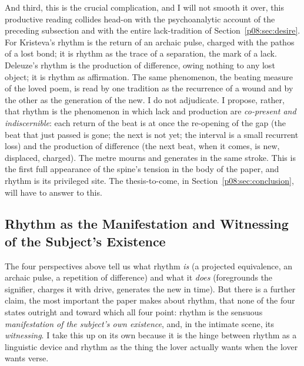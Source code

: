 And third, this is the crucial complication, and I will not smooth it over, this productive reading collides head-on with the psychoanalytic account of the preceding subsection and with the entire lack-tradition of Section~\ref{p08:sec:desire}. For Kristeva's rhythm is the return of an archaic pulse, charged with the pathos of a lost bond; it is rhythm as the trace of a separation, the mark of a lack. Deleuze's rhythm is the production of difference, owing nothing to any lost object; it is rhythm as affirmation. The same phenomenon, the beating measure of the loved poem, is read by one tradition as the recurrence of a wound and by the other as the generation of the new. I do not adjudicate. I propose, rather, that rhythm is the phenomenon in which lack and production are \emph{co-present and indiscernible}: each return of the beat is at once the re-opening of the gap (the beat that just passed is gone; the next is not yet; the interval is a small recurrent loss) and the production of difference (the next beat, when it comes, is new, displaced, charged). The metre mourns and generates in the same stroke. This is the first full appearance of the spine's tension in the body of the paper, and rhythm is its privileged site. The thesis-to-come, in Section~\ref{p08:sec:conclusion}, will have to answer to this.

\subsection{Rhythm as the Manifestation and Witnessing of the Subject's Existence}\label{p08:sec:rhythmwitness}

The four perspectives above tell us what rhythm \emph{is} (a projected equivalence, an archaic pulse, a repetition of difference) and what it \emph{does} (foregrounds the signifier, charges it with drive, generates the new in time). But there is a further claim, the most important the paper makes about rhythm, that none of the four states outright and toward which all four point: rhythm is the sensuous \emph{manifestation of the subject's own existence}, and, in the intimate scene, its \emph{witnessing}. I take this up on its own because it is the hinge between rhythm as a linguistic device and rhythm as the thing the lover actually wants when the lover wants verse.

